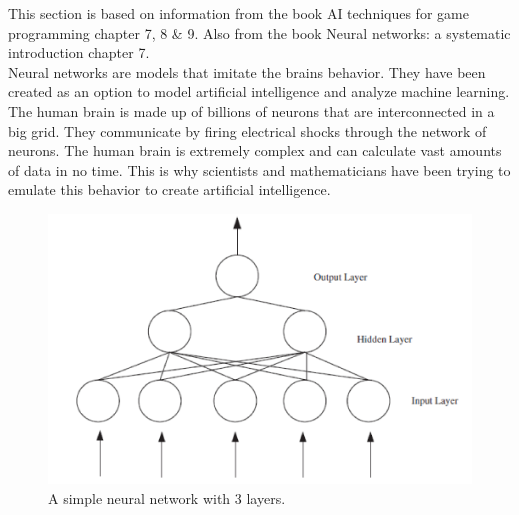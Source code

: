 This section is based on information from the book AI techniques for game programming\cite{buckland2002ai} chapter 7, 8 \& 9. Also from the book Neural networks: a systematic introduction\cite{rojas1996neural} chapter 7.
\\[0.5cm]
Neural networks are models that imitate the brains behavior. They have been created as an option to model artificial intelligence and analyze machine learning. The human brain is made up of billions of neurons that are interconnected in a big grid. They communicate by firing electrical shocks through the network of neurons. The human brain is extremely complex and can calculate vast amounts of data in no time. This is why scientists and mathematicians have been trying to emulate this behavior to create artificial intelligence.

\begin{figure}[!ht]
\centering
\includegraphics[width=0.8\linewidth]{billeder/ANN.png}
\caption{A simple neural network with 3 layers. \cite{stockForecasting}}
\label{fig:ANN}
\end{figure}

